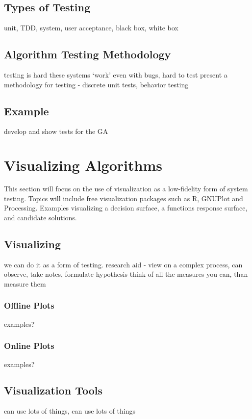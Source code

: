 \begin{bibunit}
\subsection{Types of Testing}
unit, TDD, system, user acceptance, black box, white box

\subsection{Algorithm Testing Methodology}
testing is hard
these systems `work' even with bugs, hard to test
present a methodology for testing - discrete unit tests, behavior testing

\subsection{Example}
develop and show tests for the GA

% 
% 
\section{Visualizing Algorithms}
\label{advanced:sec:visualizing}
This section will focus on the use of visualization as a low-fidelity form of system testing. Topics will include free visualization packages such as R, GNUPlot and Processing. Examples visualizing a decision surface, a functions response surface, and candidate solutions.

\subsection{Visualizing}
we can do it as a form of testing.
research aid - view on a complex process, can observe, take notes, formulate hypothesis
think of all the measures you can, than measure them

\subsubsection{Offline Plots}
examples?

\subsubsection{Online Plots}
examples?


\subsection{Visualization Tools}
can use lots of things, can use lots of things


\end{bibunit}
